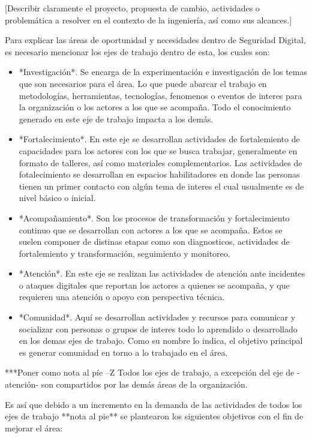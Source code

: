 \documentclass[12pt]{caltech_thesis}
\begin{document}
[Describir claramente el proyecto, propuesta de cambio, actividades o problemática a resolver en el contexto de la ingeniería, así como sus alcances.]

Para explicar las áreas de oportunidad y necesidades dentro de Seguridad Digital, es necesario mencionar los ejes de trabajo dentro de esta, los cuales son:

\begin{itemize}
    \item *Investigación*. Se encarga de la experimentación e investigación de los temas que son necesarios para el área. Lo que puede abarcar el trabajo en metodologías, herramientas, tecnologías, fenomenos o eventos de interes para la organización o los actores a los que se acompaña. Todo el conocimiento generado en este eje de trabajo impacta a los demás.
    \item *Fortalecimiento*. En este eje se desarrollan actividades de fortalemiento de capacidades para los actores con los que se busca trabajar, generalmente en formato de talleres, así como materiales complementarios. Las actividades de fotalecimiento se desarrollan en espacios habilitadores en donde las personas tienen un primer contacto con algún tema de interes el cual usualmente es de nivel básico o inicial.
    \item *Acompañamiento*. Son los procesos de transformación y fortalecimiento continuo que se desarrollan con actores a los que se acompaña. Estos se suelen componer de distinas etapas como son diagnosticos, actividades de fortalemiento y transformación, seguimiento y monitoreo. 
    \item *Atención*. En este eje se realizan las actividades de atención ante incidentes o ataques digitales que reportan los actores a quienes se acompaña, y que requieren una atención o apoyo con perspectiva técnica.
    \item *Comunidad*. Aquí se desarrollan actividades y recursos para comunicar y socializar con personas o grupos de interes todo lo aprendido o desarrollado en los demas ejes de trabajo. Como su nombre lo indica, el objetivo principal es generar comunidad en torno a lo trabajado en el área. 
\end{itemize}

***Poner como nota al píe --Z Todos los ejes de trabajo, a excepción del eje de -atención- son compartidos por las demás áreas de la organización.

Es así que debido a un incremento en la demanda de las actividades de todos los ejes de trabajo **nota al pie** se plantearon los siguientes objetivos con el fin de mejorar el área:
\end{document}
